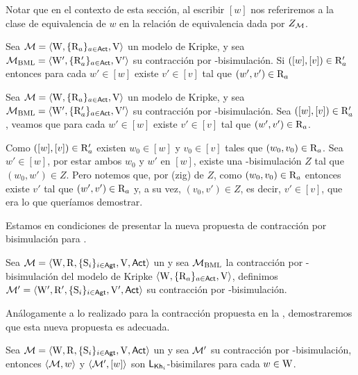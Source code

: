 Notar que en el contexto de esta sección, al escribir $[w]$ nos referiremos a la clase de equivalencia de $w$ en la relación de 
equivalencia dada por $Z_{\mathcal{M}}$.

\begin{lema}\label{lema:bml-R-lema}
    Sea $\mathcal{M} = \langle \mathrm{W},\{\mathrm{R}_a\}_{a\in{\rm \sf Act}},\mathrm{V} \rangle$ un modelo de Kripke, y sea $\mathcal{M}_{\mathrm{BML}} = \langle \mathrm{W}',\{\mathrm{R}_a'\}_{a\in{\rm \sf Act}},\mathrm{V}' \rangle$ su contracción por \bml-bisimulación.
    Si $([w],[v]) \in \mathrm{R}'_a$ entonces para cada $w' \in [w]$ existe $v' \in [v]$ tal que $(w',v') \in \mathrm{R}_a$
\end{lema}

\begin{demostracion}
    Sea $\mathcal{M} = \langle \mathrm{W},\{\mathrm{R}_a\}_{a\in{\rm \sf Act}},\mathrm{V} \rangle$ un modelo de Kripke, y sea $\mathcal{M}_{\mathrm{BML}} = \langle \mathrm{W}',\{\mathrm{R}_a'\}_{a\in{\rm \sf Act}},\mathrm{V}' \rangle$ su contracción por \bml-bisimulación. Sea $([w],[v]) \in \mathrm{R}'_a$, veamos que para cada $w' \in [w]$ existe $v' \in [v]$ tal que $(w',v') \in \mathrm{R}_a$.

    Como $([w],[v]) \in \mathrm{R}'_a$ existen $w_0 \in [w]$ y $v_0 \in [v]$ tales que $(w_0,v_0)\in \mathrm{R}_a$. Sea $w' \in [w]$, por estar ambos 
    $w_0$ y $w'$ en $[w]$, existe una \bml-bisimulación $Z$ tal que $(w_0,w') \in Z$. Pero notemos que, por (zig) de $Z$, como 
    $(w_0,v_0) \in \mathrm{R}_a$  entonces existe $v'$ tal que $(w',v') \in \mathrm{R}_a$ y, a su vez, 
    $(v_0,v') \in Z$, es decir, $v' \in [v]$, que era lo que queríamos demostrar.
\end{demostracion}

Estamos en condiciones de presentar la nueva propuesta de contracción por bisimulación para \KHilogic.

\begin{definicion}
    Sea $\mathcal{M}=\langle \mathrm{W},\mathrm{R},\{ \mathrm{S}_i \}_{i \in {\rm \sf Agt}},\mathrm{V},{\rm \sf Act} \rangle$ un \ults y sea $\mathcal{M}_{\mathrm{BML}}$ 
    la contracción por \bml-bisimulación del modelo de Kripke $\langle \mathrm{W},\{\mathrm{R}_a\}_{a\in{\rm \sf Act}},\mathrm{V} \rangle$, definimos 
    $\mathcal{M}'=\langle \mathrm{W}', \mathrm{R}', \{ \mathrm{S}_i \}_{i\in{\rm \sf Agt}},\mathrm{V}',{\rm \sf Act} \rangle$ su contracción por \KHilogic-bisimulación.
\end{definicion}

Análogamente a lo realizado para la contracción propuesta en la , demostraremos que esta nueva propuesta es 
adecuada. 

\begin{teorema}
    Sea $\mathcal{M}=\langle \mathrm{W},\mathrm{R},\{ \mathrm{S}_i \}_{i \in {\rm \sf Agt}},\mathrm{V},{\rm \sf Act} \rangle$ un \ults y sea $\mathcal{M}'$ 
    su contracción por \KHilogic-bisimulación, 
    entonces $\langle \mathcal{M},w \rangle$ y $\langle \mathcal{M}',[w] \rangle$ son $\mathsf{L}_{\mathsf{Kh}_i}$-bisimilares para cada $w \in \mathrm{W}$.
\end{teorema}


